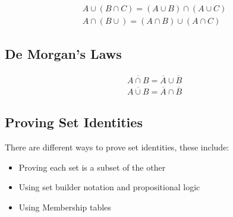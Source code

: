 \documentclass[12pt letter]{report}
\begin{document}
\begin{align*}
	A \cup \left( B \cap C \right)  = \left( A \cup B \right)  \cap \left( A \cup C \right) \\
	A \cap \left( B \cup  \right)  = \left( A \cap B \right)  \cup \left( A \cap C \right)
\end{align*}

\subsection{De Morgan's Laws}
\begin{align*}
	\overline{A \cap  B} = \overline{A} \cup \overline{B} \\
	\overline{A \cup B } = \overline{A} \cap \overline{B}
\end{align*}

\subsection{Proving Set Identities}

There are different ways to prove set identities, these include:
\begin{itemize}
	\item Proving each set is a subset of the other
	\item Using set builder notation and propositional logic
	\item Using Membership tables
\end{itemize}

\end{document}
